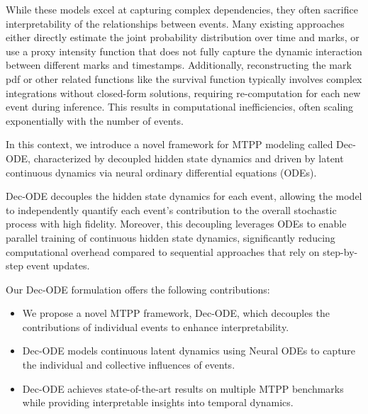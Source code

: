 While these models excel at capturing complex dependencies, they often sacrifice interpretability of the relationships between events. 
Many existing approaches either directly estimate the joint probability distribution over time and marks, or use a proxy intensity function that does not fully capture the dynamic interaction between different marks and timestamps. 
Additionally, reconstructing the mark pdf or other related functions like the survival function typically involves complex integrations without closed-form solutions, requiring re-computation for each new event during inference. This results in computational inefficiencies, often scaling exponentially with the number of events.

In this context, we introduce a novel framework for MTPP modeling called Dec-ODE, characterized by decoupled hidden state dynamics and driven by latent continuous dynamics via neural ordinary differential equations (ODEs). 

Dec-ODE decouples the hidden state dynamics for each event, allowing the model to independently quantify each event’s contribution to the overall stochastic process with high fidelity. 
Moreover, this decoupling leverages ODEs to enable parallel training of continuous hidden state dynamics, significantly reducing computational overhead compared to sequential approaches that rely on step-by-step event updates.

Our Dec-ODE formulation offers the following contributions:
\begin{itemize}
\item We propose a novel MTPP framework, Dec-ODE, which decouples the contributions of individual events to enhance interpretability.
\item Dec-ODE models continuous latent dynamics using Neural ODEs to capture the individual and collective influences of events.
\item Dec-ODE achieves state-of-the-art results on multiple MTPP benchmarks while providing interpretable insights into temporal dynamics.
\end{itemize}

